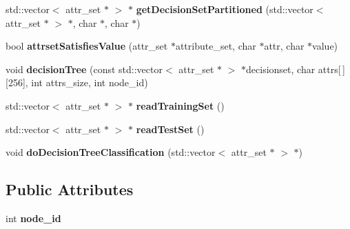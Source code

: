 \begin{DoxyCompactItemize}
\item 
\hypertarget{classDecisionTreeClassifier_ac8bdb075bd948f5e6f30954e42ecd49e}{std\-::vector$<$ attr\-\_\-set $\ast$ $>$ $\ast$ {\bfseries get\-Decision\-Set\-Partitioned} (std\-::vector$<$ attr\-\_\-set $\ast$ $>$ $\ast$, char $\ast$, char $\ast$)}\label{classDecisionTreeClassifier_ac8bdb075bd948f5e6f30954e42ecd49e}

\item 
\hypertarget{classDecisionTreeClassifier_af929a41edef5353d7cdbc980ac16f129}{bool {\bfseries attrset\-Satisfies\-Value} (attr\-\_\-set $\ast$attribute\-\_\-set, char $\ast$attr, char $\ast$value)}\label{classDecisionTreeClassifier_af929a41edef5353d7cdbc980ac16f129}

\item 
\hypertarget{classDecisionTreeClassifier_a299ee80822844c7edf3c75d3739807de}{void {\bfseries decision\-Tree} (const std\-::vector$<$ attr\-\_\-set $\ast$ $>$ $\ast$decisionset, char attrs\mbox{[}$\,$\mbox{]}\mbox{[}256\mbox{]}, int attrs\-\_\-size, int node\-\_\-id)}\label{classDecisionTreeClassifier_a299ee80822844c7edf3c75d3739807de}

\item 
\hypertarget{classDecisionTreeClassifier_a7605de6b4fd67d97a53410154736956c}{std\-::vector$<$ attr\-\_\-set $\ast$ $>$ $\ast$ {\bfseries read\-Training\-Set} ()}\label{classDecisionTreeClassifier_a7605de6b4fd67d97a53410154736956c}

\item 
\hypertarget{classDecisionTreeClassifier_a9e66f608c3462ba929109098719273be}{std\-::vector$<$ attr\-\_\-set $\ast$ $>$ $\ast$ {\bfseries read\-Test\-Set} ()}\label{classDecisionTreeClassifier_a9e66f608c3462ba929109098719273be}

\item 
\hypertarget{classDecisionTreeClassifier_aa353eb0012aab7cf0a2af95afa523d15}{void {\bfseries do\-Decision\-Tree\-Classification} (std\-::vector$<$ attr\-\_\-set $\ast$ $>$ $\ast$)}\label{classDecisionTreeClassifier_aa353eb0012aab7cf0a2af95afa523d15}

\end{DoxyCompactItemize}
\subsection*{Public Attributes}
\begin{DoxyCompactItemize}
\item 
\hypertarget{classDecisionTreeClassifier_a44bc3e8c3c516eef03e889140397d42e}{int {\bfseries node\-\_\-id}}\label{classDecisionTreeClassifier_a44bc3e8c3c516eef03e889140397d42e}

\end{DoxyCompactItemize}


